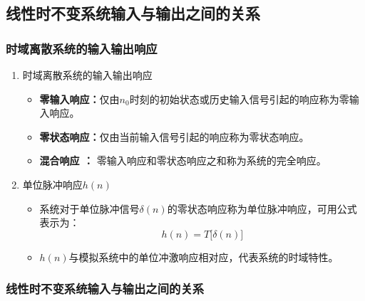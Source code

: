 \documentclass[notheorems,compress,mathserif,table]{beamer}
\newtheorem{dablock}{}
\begin{document}
\subsection{线性时不变系统输入与输出之间的关系}
\begin{frame}[shrink]\frametitle{时域离散系统的输入输出响应}%
\begin{enumerate}
  \item 时域离散系统的输入输出响应
      \begin{itemize}
        \item \textbf{零输入响应：}仅由$n_0$时刻的初始状态或历史输入信号引起的响应称为零输入响应。
        \item \textbf{零状态响应：}仅由当前输入信号引起的响应称为零状态响应。
        \item \textbf{混合响应 ：} 零输入响应和零状态响应之和称为系统的完全响应。
      \end{itemize}
  \item    单位脉冲响应$h(n)$
      \begin{itemize}
        \item 系统对于单位脉冲信号$\delta(n)$的零状态响应称为单位脉冲响应，可用公式表示为：
        $$h(n) = T\big[\delta(n)\big]$$
        \item $h(n)$与模拟系统中的单位冲激响应相对应，代表系统的时域特性。
      \end{itemize}
\end{enumerate}


\end{frame}

\subsubsection*{线性时不变系统输入与输出之间的关系}
\end{document}
